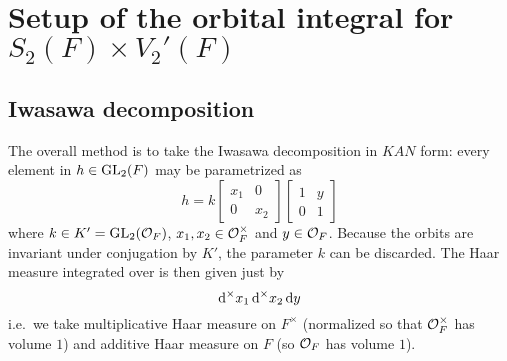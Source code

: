 \section{Setup of the orbital integral for $S_2(F) \times V_2'(F)$}
\label{sec:orbitalFJ1}

\subsection{Iwasawa decomposition}
The overall method is to take the Iwasawa decomposition in $KAN$ form:
every element in $h \in \operatorname{GL}_2(F)$ may be parametrized as
\[ h = k \begin{bmatrix} x_1 & 0 \\ 0 & x_2 \end{bmatrix}
  \begin{bmatrix} 1 & y \\ 0 & 1 \end{bmatrix} \]
where $k \in K' = \operatorname{GL}_2(\mathcal O_F)$, $x_1, x_2 \in \mathcal O_F^\times$ and $y \in \mathcal O_F$.
Because the orbits are invariant under conjugation by $K'$,
the parameter $k$ can be discarded.
The Haar measure integrated over is then given just by
\[ \odif[\times] x_1 \odif[\times] x_2 \odif y \]
i.e.\ we take multiplicative Haar measure on $F^\times$
(normalized so that $\mathcal O_F^\times$ has volume $1$)
and additive Haar measure on $F$
(so $\mathcal O_F$ has volume $1$).

